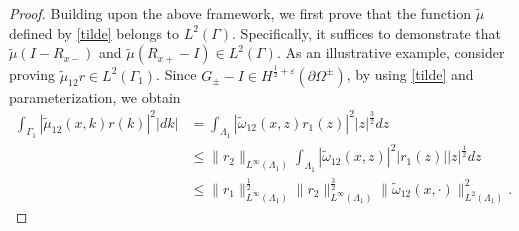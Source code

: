\documentclass[preprint,compress,12pt]{elsarticle}
\numberwithin{equation}{section}
\begin{document}
\begin{proof}
Building upon the above framework, we first prove that the function $\tilde{\mu}$ defined by \eqref{tilde} belongs to $L^{2}(\Gamma)$. Specifically, it suffices to demonstrate that $\tilde{\mu}(I-R_{x-})$ and  $\tilde{\mu}(R_{x+}-I)\in L^{2}(\Gamma)$. As an illustrative example, consider proving $\tilde{\mu}_{12}r\in L^{2}(\Gamma_{1})$. Since $G_{\pm}-I\in H^{\frac{1}{2}+\varepsilon}(\partial\Omega^{\pm})$, by using \eqref{tilde} and parameterization, we obtain
\begin{equation*}
\begin{aligned}
\int_{\Gamma_{1}}|\tilde{\mu}_{12}(x,k)r(k)|^{2}|dk|&=\int_{\Lambda_{1}}|\tilde{\omega}_{12}(x,z)r_{1}(z)|^{2}|z|^{\frac{3}{2}}dz\\
&\leq \|r_{2}\|_{L^{\infty}(\Lambda_{1})}\int_{\Lambda_{1}}|\tilde{\omega}_{12}(x,z)|^{2}|r_{1}(z)||z|^{\frac{1}{2}}dz\\
&\leq\|r_{1}\|_{L^{\infty}(\Lambda_{1})}^{\frac{1}{2}}\|r_{2}\|_{L^{\infty}(\Lambda_{1})}^{\frac{3}{2}}\|\tilde{\omega}_{12}(x,\cdot)\|_{L^{2}(\Lambda_{1})}^{2}.
\end{aligned}
\end{equation*}


\end{proof}
\end{document}
